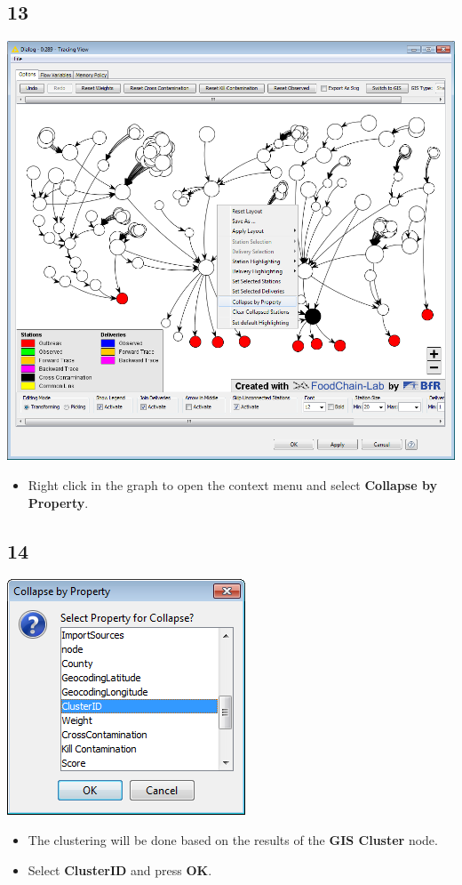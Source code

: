 \documentclass{beamer}
\begin{document}
\subsection{13}
\begin{frame}
	\begin{center}
  		\includegraphics[height=0.6\textheight]{13.png}
	\end{center}
	\begin{itemize}
		\item Right click in the graph to open the context menu and select \textbf{Collapse by Property}.
	\end{itemize}
\end{frame}

\subsection{14}
\begin{frame}
	\begin{center}
  		\includegraphics[height=0.5\textheight]{14.png}
	\end{center}
	\begin{itemize}
		\item The clustering will be done based on the results of the \textbf{GIS Cluster} node.
		\item Select \textbf{ClusterID} and press \textbf{OK}.
	\end{itemize}
\end{frame}
\end{document}
